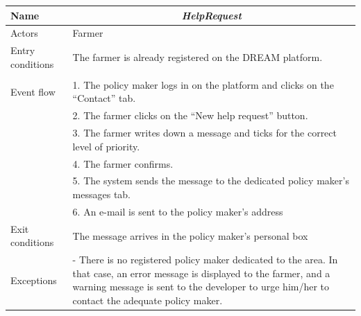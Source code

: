 \begin{table}[H]
	\centering
	\begin{tabularx}{\linewidth}{|l|X|}
		\hline
		Name & \multicolumn{1}{c|}{\textit{\textbf{HelpRequest}}}                                                   \tabularnewline \hline
		Actors                                               & Farmer                                               \tabularnewline \hline
		Entry conditions                                              &
		The farmer is already registered on the DREAM platform.
		\tabularnewline
		&
		\tabularnewline \hline
		Event flow                                         & 1.	The policy maker logs in on the platform and clicks on the “Contact” tab.                                        \tabularnewline 
		& 2.	The farmer clicks on the “New help request” button.                                   \tabularnewline 
		& 3.	The farmer writes down a message and ticks for the correct level of priority.                                           \tabularnewline 
		& 4.	The farmer confirms.                                   \tabularnewline
		& 5.	The system sends the message to the dedicated policy maker’s messages tab.                                          \tabularnewline
		& 6.	An e-mail is sent to the policy maker’s address                                    \tabularnewline
		\hline
		Exit conditions 
		& The message arrives in the policy maker’s personal box
		\tabularnewline \hline
		Exceptions 
		& 
		-	There is no registered policy maker dedicated to the area. In that case, an error message is displayed to the farmer, and a warning message is sent to the developer to urge him/her to contact the adequate policy maker.
		\tabularnewline
		\hline
	\end{tabularx}   
\end{table}

